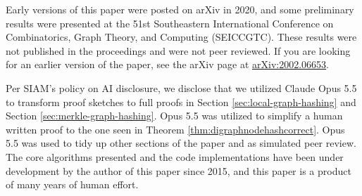 \documentclass[twoside,leqno]{article}
\begin{document}
Early versions of this paper were posted on arXiv in 2020, and some preliminary results were presented at the 51st Southeastern International Conference on Combinatorics, Graph Theory, and Computing (SEICCGTC). These results were not published in the proceedings and were not peer reviewed. If you are looking for an earlier version of the paper, see the arXiv page at \href{https://arxiv.org/abs/2002.06653}{arXiv:2002.06653}.

Per SIAM's policy on AI disclosure, we disclose that we utilized Claude Opus 5.5 to transform proof sketches to full proofs in Section \ref{sec:local-graph-hashing} and Section \ref{sec:merkle-graph-hashing}. Opus 5.5 was utilized to simplify a human written proof to the one seen in Theorem \ref{thm:digraphnodehashcorrect}. Opus 5.5 was used to tidy up other sections of the paper and as simulated peer review. The core algorithms presented and the code implementations have been under development by the author of this paper since 2015, and this paper is a product of many years of human effort.



\end{document}
